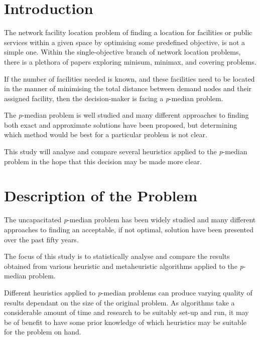 \documentclass[11pt]{article}
\newcommand{\np}{\newpage}
\begin{document}
	\tableofcontents
	\thispagestyle{empty}
	\np

\setcounter{page}{1}		
	\section{Introduction} \label{introduction}
	The network facility location problem of finding a location for facilities or public services within a given space by optimising some predefined objective, is not a simple one.  Within the single-objective branch of network location problems, there is a plethora of papers exploring minisum, minimax, and covering problems.
	
	If the number of facilities needed is known, and these facilities need to be located in the manner of minimising the total distance between demand nodes and their assigned facility, then the decision-maker is facing a \emph{p}-median problem.
	
	The \emph{p}-median problem  is well studied and many different approaches to finding both exact and approximate solutions have been proposed, but determining which method would be best for a particular problem is not clear.
	
	This study will analyse and compare several heuristics applied to the \emph{p}-median problem in the hope that this decision may be made more clear.	
	
	
	\section{Description of the Problem} \label{problem.statement}
	The uncapacitated \emph{p}-median problem has been widely studied and many different approaches to finding an acceptable, if not optimal, solution have been presented over the past fifty years.
	
	The focus of this study is to statistically analyse and compare the results obtained from various heuristic and metaheuristic algorithms applied to the \emph{p}-median problem.
	
	Different heuristics applied to \emph{p}-median problems can produce varying quality of results dependant on the size of the original problem.  As algorithms take a considerable amount of time and research to be suitably set-up and run, it may be of benefit to have some prior knowledge of which heuristics may be suitable for the problem on hand.
	
\end{document}
